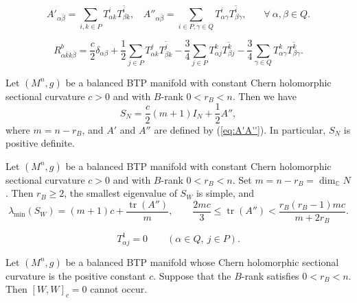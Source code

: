 \documentclass[10pt,a4paper]{amsart}
\newcommand{\C}{{\mathbb C}}
\begin{document}
\begin{equation} \label{eq:A'A''}
 A'_{\alpha \bar{\beta}} = \sum_{i,k\in P}T^i_{\alpha k} \overline{ T^i_{\beta k}} , \ \ \ \ A''_{\alpha \bar{\beta}} = \sum_{i\in P, \gamma \in Q}T^i_{\alpha \gamma} \overline{ T^i_{\beta \gamma}} , \ \ \ \ \ \ \ \ \forall \ \alpha , \beta \in Q.
 \end{equation}

\begin{equation} \label{eq:cross}
 R^b_{\alpha\bar{k}k\bar{\beta}} = \frac{c}{2}\delta_{\alpha \beta} +\frac{1}{2} \sum_{j\in P} T^j_{\alpha k} \overline{ T^j_{\beta k} } -\frac{3}{4} \sum_{j\in P} T^k_{\alpha j} \overline{ T^k_{\beta j} }  -\frac{3}{4} \sum_{\gamma \in Q} T^k_{\alpha \gamma } \overline{ T^k_{\beta \gamma } }.
\end{equation}

\begin{lemma} \label{lemma-min}
Let $(M^n,g)$ be a balanced BTP manifold with constant Chern holomorphic sectional curvature $c>0$ and with $B$-rank $0<r_B<n$. Then we have
\begin{equation}  \label{eq:SN}
S_N = \frac{c}{2}(m+1)I_N + \frac{1}{2}A'',
\end{equation}
where $m=n-r_B$, and $A'$ and $A''$ are defined by (\ref{eq:A'A''}). In particular, $S_N $ is positive definite.
\end{lemma}

\begin{lemma} \label{lemma-SWmin}
Let $(M^n,g)$ be a balanced BTP manifold with  constant  Chern
holomorphic sectional curvature  $c>0$ and with $B$-rank
$0<r_B<n$.   Set $m=n-r_B=\dim_{\C}N$. Then  $r_B\geq 2$, the smallest
eigenvalue of $S_W$ is simple, and
\begin{equation} \label{eq:SWmin}
 \lambda_{\min}(S_W)
 = (m+1)c+\frac{\operatorname{tr}(A'')}{m},
 \qquad
 \frac{2mc}{3}\leq\operatorname{tr}(A'')
 <\frac{r_B(r_B-1)mc}{m+2r_B}.
\end{equation}
 \end{lemma}

\begin{equation}\label{eq:lemma12-min-output}
 T^1_{\alpha j}=0
 \qquad(\alpha\in Q,\ j\in P).
\end{equation}

\begin{proposition}\label{prop2}
Let $(M^n,g)$ be a balanced BTP manifold   whose  Chern holomorphic
sectional curvature   is the positive constant $c$. Suppose that the
 $B$-rank satisfies $0<r_B<n$. Then $[W,W]_c=0$ cannot occur.
\end{proposition}
\end{document}

